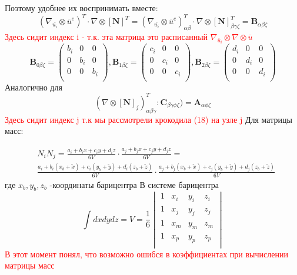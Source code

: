 \documentclass[a4paper,12pt]{article}
\begin{document}
Поэтому удобнее их воспринимать вместе:
\begin{equation}
    (\nabla_{\overline{u_i}} \otimes \overline{u}^e)^T \cdot \nabla \otimes [\textbf{N}]^T = (\nabla_{\overline{u_i}} \otimes \overline{u}^e)^T_{\alpha \beta} \cdot \nabla \otimes [\textbf{N}]^T_{\beta \gamma \zeta} = \textbf{B}_{\alpha \beta \zeta}
\end{equation}
\textcolor{red}{Здесь сидит индекс i - т.к. эта матрица это расписанный $\nabla_{\overline{u}_i} \otimes  \nabla \otimes \overline{u}$}
\begin{equation}
    \textbf{B}_{0\beta \zeta} = 
\begin{pmatrix}
b_i & 0   & 0   \\
0   & b_i & 0   \\
0   & 0   & b_i \\
\end{pmatrix},  \textbf{B}_{1\beta \zeta} = 
\begin{pmatrix}
c_i & 0   & 0   \\
0   & c_i & 0   \\
0   & 0   & c_i \\
\end{pmatrix}, \textbf{B}_{2\beta\zeta} = 
\begin{pmatrix}
d_i & 0   & 0   \\
0   & d_i & 0   \\
0   & 0   & d_i \\
\end{pmatrix}
\end{equation}
Аналогично для 
\begin{equation}
    (\nabla \otimes[\textbf{N}]_j)_{\alpha \beta \gamma}^T:\textbf{C}_{\beta \gamma \phi \zeta}) = \textbf{A}_{\alpha \phi \zeta}
\end{equation}
\textcolor{red}{ Здесь сидит индекс j т.к мы рассмотрели крокодила (18) на узле j}
Для матрицы масс: \par
\begin{align}
    & N_i N_j= \frac{a_i + b_i x + c_i y + d_i z}{6V} \cdot  \frac{a_j + b_j x + c_j y + d_j z}{6V} = \\
    &\frac{a_i + b_i (x_b + \tilde{x}) + c_i (y_b + \tilde{y}) + d_i (z_b + \tilde{z})}{6V} \cdot  \frac{a_j + b_j (x_b + \tilde{x}) + c_j (y_b + \tilde{y}) + d_j (z_b + \tilde{z})}{6V}
\end{align}
где $x_b,y_b,z_b$ -координаты барицентра
В системе барицентра
\begin{equation}
    \int dxdydz = V = \frac{1}{6}     \begin{vmatrix}
1 & x_i & y_i & z_i \\ 
1 & x_j & y_j & z_j \\ 
1 & x_m & y_m & z_m \\ 
1 & x_p & y_p & z_p \\
    \end{vmatrix} 
\end{equation}
\textcolor{red}{В этот момент понял, что возможно ошибся в коэффициентах при вычислении матрицы масс}
\end{document}
